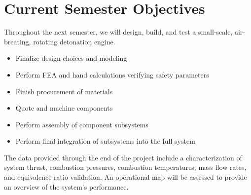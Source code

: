 \section*{Current Semester Objectives}

Throughout the next semester, we will design, build, and test a small-scale, air-breating, rotating detonation engine.

\begin{itemize}
    \itemsep0em
    \item Finalize design choices and modeling
    \item Perform FEA and hand calculations verifying safety parameters
    \item Finish procurement of materials
    \item Quote and machine components
    \item Perform assembly of component subsystems
    \item Perform final integration of subsystems into the full system
\end{itemize}

The data provided through the end of the project include a characterization of system thrust, combustion pressures, combustion temperatures, mass flow rates, and equivalence ratio validation. An operational map will be assessed to provide an overview of the system’s performance. 